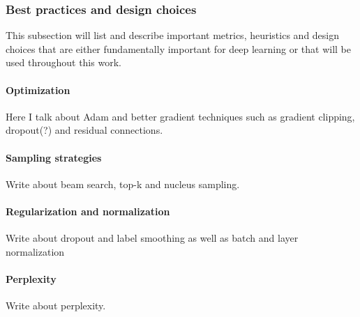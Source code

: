 \subsubsection{Best practices and design choices}
\label{sub:best_practices_and_design_choices}

This subsection will list and describe important metrics, heuristics and design choices that are either fundamentally important for deep learning or that will be used throughout this work.

\paragraph{Optimization}
Here I talk about Adam and better gradient techniques such as gradient clipping, dropout(?) and residual connections.

\paragraph{Sampling strategies}
Write about beam search, top-k and nucleus sampling.

\paragraph{Regularization and normalization}
Write about dropout and label smoothing as well as batch and layer normalization

\paragraph{Perplexity}
Write about perplexity.

